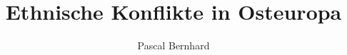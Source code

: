 \documentclass[
10pt,			%
paper=a4,		%
ngerman,		%
BCOR=0pt,		%
DIV=calc,		%
headinclude,	%
headsepline,	%
numbers=noenddot,
twocolumn,
]{scrartcl}
\title{Ethnische Konflikte in Osteuropa}
\author{Pascal Bernhard}
\begin{document}
\maketitle

\begin{abstract}

\end{abstract}

\section{}
\end{document}
